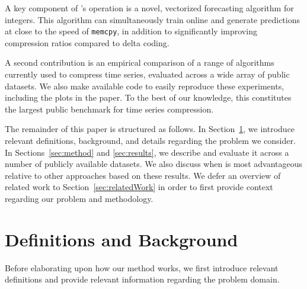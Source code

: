 A key component of \mine's operation is a novel, vectorized forecasting algorithm for integers. This algorithm can simultaneously train online and generate predictions at close to the speed of \texttt{memcpy}, in addition to significantly improving compression ratios compared to delta coding.

A second contribution is an empirical comparison of a range of algorithms currently used to compress time series, evaluated across a wide array of public datasets. We also make available code to easily reproduce these experiments, including the plots in the paper. To the best of our knowledge, this constitutes the largest public benchmark for time series compression.

The remainder of this paper is structured as follows. In Section~\ref{sec:problem}, we introduce relevant definitions, background, and details regarding the problem we consider. In Sections~\ref{sec:method} and \ref{sec:results}, we describe \minesp and evaluate it across a number of publicly available datasets. We also discuss when \minesp is most advantageous relative to other approaches based on these results. We defer an overview of related work to Section~\ref{sec:relatedWork} in order to first provide context regarding our problem and methodology.





\section{Definitions and Background} \label{sec:problem}

Before elaborating upon how our method works, we first introduce relevant definitions and provide relevant information regarding the problem domain.


